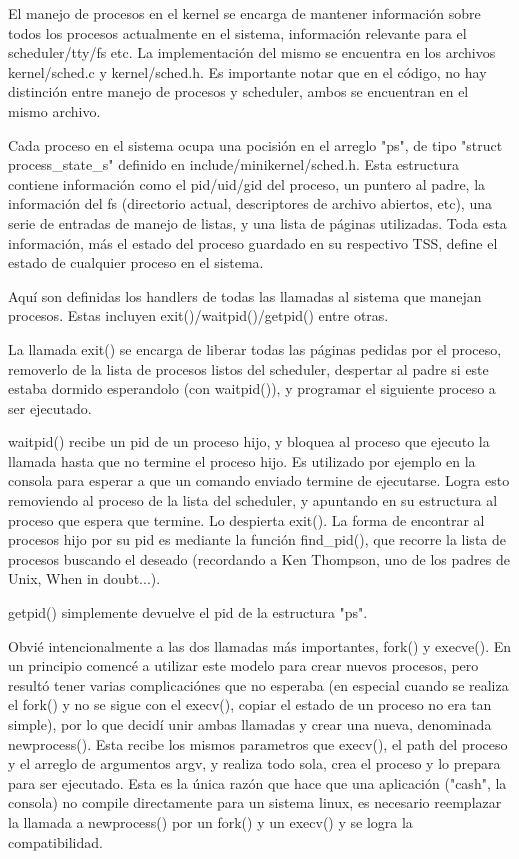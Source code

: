 El manejo de procesos en el kernel se encarga de mantener información sobre
todos los procesos actualmente en el sistema, información relevante para el
scheduler/tty/fs etc. La implementación del mismo se encuentra en los archivos
kernel/sched.c y kernel/sched.h. Es importante notar que en el código, no hay
distinción entre manejo de procesos y scheduler, ambos se encuentran en el
mismo archivo.

Cada proceso en el sistema ocupa una pocisión en el arreglo "ps", de tipo
"struct process\_state\_s" definido en include/minikernel/sched.h. Esta
estructura contiene información como el pid/uid/gid del proceso, un puntero al
padre, la información del fs (directorio actual, descriptores de archivo
abiertos, etc), una serie de entradas de manejo de listas, y una lista de
páginas utilizadas. Toda esta información, más el estado del proceso guardado
en su respectivo TSS, define el estado de cualquier proceso en el sistema.

Aquí son definidas los handlers de todas las llamadas al sistema que manejan
procesos. Estas incluyen exit()/waitpid()/getpid() entre otras.

La llamada exit() se encarga de liberar todas las páginas pedidas por el
proceso, removerlo de la lista de procesos listos del scheduler, despertar al
padre si este estaba dormido esperandolo (con waitpid()), y programar el
siguiente proceso a ser ejecutado.

waitpid() recibe un pid de un proceso hijo, y bloquea al proceso que ejecuto la
llamada hasta que no termine el proceso hijo. Es utilizado por ejemplo en la
consola para esperar a que un comando enviado termine de ejecutarse. Logra esto
removiendo al proceso de la lista del scheduler, y apuntando en su estructura
al proceso que espera que termine. Lo despierta exit(). La forma de encontrar
al procesos hijo por su pid es mediante la función find\_pid(), que recorre la
lista de procesos buscando el deseado (recordando a Ken Thompson, uno de los
padres de Unix, When in doubt...).

getpid() simplemente devuelve el pid de la estructura "ps".

Obvié intencionalmente a las dos llamadas más importantes, fork() y execve().
En un principio comencé a utilizar este modelo para crear nuevos procesos, pero
resultó tener varias complicaciónes que no esperaba (en especial cuando se
realiza el fork() y no se sigue con el execv(), copiar el estado de un proceso
no era tan simple), por lo que decidí unir ambas llamadas y crear una nueva,
denominada newprocess(). Esta recibe los mismos parametros que execv(), el path
del proceso y el arreglo de argumentos argv, y realiza todo sola, crea el
proceso y lo prepara para ser ejecutado. Esta es la única razón que hace que
una aplicación ("cash", la consola) no compile directamente para un sistema
linux, es necesario reemplazar la llamada a newprocess() por un fork() y un
execv() y se logra la compatibilidad.

